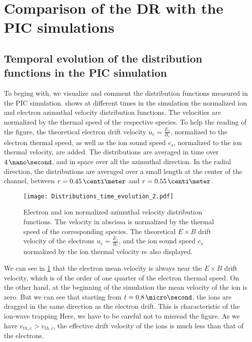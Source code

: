\FloatBarrier
\section{Comparison of the \acs{DR} with the \acs{PIC} simulations}
  \label{sec-DR-results}
  
  

  \subsection{Temporal evolution of the distribution functions in the \acs{PIC} simulation} \label{subsec-VDFpic}
  
  To beging with, we visualize and comment the distribution functions measured in the \ac{PIC} simulation.
   shows at different times in the simulation the normalized ion and electron azimuthal velocity distribution functions.
  The velocities are normalized by the thermal speed of the respective species.
  To help the reading of the figure, the  theoretical electron drift velocity $u_e = \frac{E_z}{B_r}$, normalized to the electron thermal speed, as well as the ion sound speed $c_s$, normalized to the ion thermal velocity, are added.
  The distributions are averaged in time over $4\,\nano\second$, and in space over all the azimuthal direction.
  In the radial direction, the distributions are averaged over a small length at the center of the channel, between $r=0.45\,\centi\meter$ and $r=0.55\,\centi\meter$.
  
  \begin{figure}[!hbt]
    \centering
    \texttt{[image: Distributions\_time\_evolution\_2.pdf]}
    \caption{Electron and ion normalized azimuthal velocity distribution functions. The velocity in abscissa is normalized by the thermal speed of the corresponding species. The theoretical $E\times B$ drift velocity of the electrons $u_e = \frac{E_z}{B_r}$, and the ion sound speed $c_s$ normalized by the ion thermal velocity re also displayed.}
    \label{fig-vdfs_pic_time}
  \end{figure}
  
  We can see in \cref{fig-vdfs_pic_time} that the electron mean velocity is always near the $E \times B$ drift velocity, which is of the order of one quarter of the electron thermal speed.
  On the other hand, at the beginning of the simulation the mean velocity of the ion is zero.
  But we can see that starting from $t=0.8\,\micro\second$, the ions are dragged in the same direction as the electron drift.
  This is characteristic of the ion-wave trapping \citep{lafleur2017a}
  Here, we have to be careful not to misread the figure.
  As we have $v_{th, e} > v_{th, i}$, the effective drift velocity of the ions is much less than that of the electrons.
  
